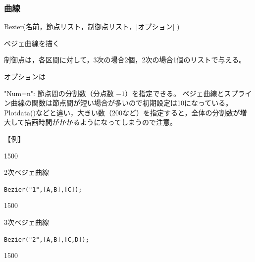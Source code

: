 \documentclass[papersize,a4paper,12pt,uplatex]{jsarticle}
\begin{document}
\subsubsection{曲線}
\begin{description}

\hypertarget{bezier}{}
\item[関数]Bezier(名前，節点リスト，制御点リスト，[オプション] )
\item[機能]ベジェ曲線を描く
\item[説明]制御点は，各区間に対して，3次の場合2個，2次の場合1個のリストで与える。

オプションは

"Num=n": 節点間の分割数（分点数 $-1$）を指定できる。 ベジェ曲線とスプライン曲線の関数は節点間が短い場合が多いので初期設定は10になっている。Plotdata()などと違い，大きい数（200など）を指定すると，全体の分割数が増大して描画時間がかかるようになってしまうので注意。

\vspace{\baselineskip}
【例】

\begin{layer}{150}{0}
\end{layer}

2次ベジェ曲線

\verb|Bezier("1",[A,B],[C]);|

\vspace{10mm}

\begin{layer}{150}{0}
\end{layer}

3次ベジェ曲線

\verb|Bezier("2",[A,B],[C,D]);|

\vspace{15mm}

\begin{layer}{150}{0}
\end{layer}






\end{description}
\end{document}
